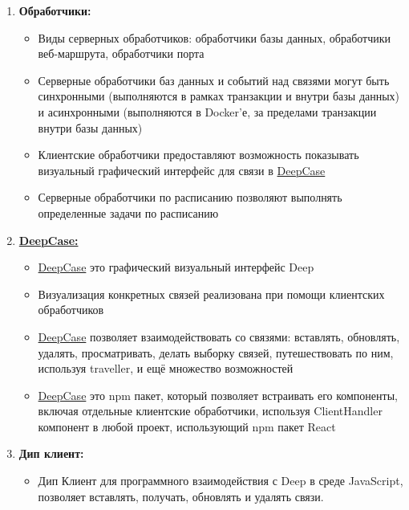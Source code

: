 \documentclass{article}
\begin{document}
\begin{enumerate}
  \item \textbf{Обработчики:}
        \begin{itemize}
          \item Виды серверных обработчиков: обработчики базы данных,
                обработчики веб-маршрута, обработчики порта
          \item Серверные обработчики баз данных и событий над связями могут
                быть синхронными (выполняются в рамках транзакции и внутри базы
                данных) и
                асинхронными (выполняются в Docker'е, за пределами транзакции
                внутри базы
                данных)
          \item Клиентские обработчики предоставляют возможность показывать
                визуальный графический интерфейс для связи в
                \hyperlink{DeepCase.Def}{DeepCase}
          \item Серверные обработчики по расписанию позволяют выполнять
                определенные задачи по расписанию
        \end{itemize}

  \item \textbf{\hyperlink{DeepCase.Def}{DeepCase:}}
        \begin{itemize}
          \item \hyperlink{DeepCase.Def}{DeepCase} это графический визуальный
                интерфейс Deep
          \item Визуализация конкретных связей реализована при помощи
                клиентских обработчиков
          \item \hyperlink{DeepCase.Def}{DeepCase} позволяет взаимодействовать
                со связями: вставлять,
                обновлять, удалять, просматривать, делать выборку связей,
                путешествовать по ним, используя traveller, и ещё множество
                возможностей
          \item \hyperlink{DeepCase.Def}{DeepCase} это npm пакет, который
                позволяет встраивать его
                компоненты, включая отдельные клиентские обработчики, используя
                ClientHandler
                компонент в любой проект, использующий npm пакет React
        \end{itemize}

  \item \textbf{Дип клиент:}
        \begin{itemize}
          \item Дип Клиент для программного взаимодействия с Deep в среде
                JavaScript, позволяет вставлять, получать, обновлять и удалять
                связи.
        \end{itemize}


\end{enumerate}
\end{document}
